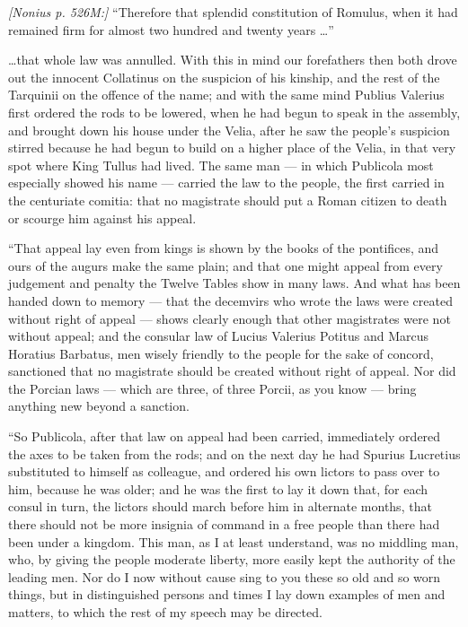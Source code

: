  \textit{[Nonius p. 526M:]} ``Therefore that splendid constitution of Romulus, when it had remained firm for almost two hundred and twenty years \ldots''

 \ldots that whole law was annulled. With this in mind our forefathers then both drove out the innocent Collatinus on the suspicion of his kinship, and the rest of the Tarquinii on the offence of the name; and with the same mind Publius Valerius first ordered the rods to be lowered, when he had begun to speak in the assembly, and brought down his house under the Velia, after he saw the people's suspicion stirred because he had begun to build on a higher place of the Velia, in that very spot where King Tullus had lived. The same man --- in which Publicola most especially showed his name --- carried the law to the people, the first carried in the centuriate comitia: that no magistrate should put a Roman citizen to death or scourge him against his appeal.

 ``That appeal lay even from kings is shown by the books of the pontifices, and ours of the augurs make the same plain; and that one might appeal from every judgement and penalty the Twelve Tables show in many laws. And what has been handed down to memory --- that the decemvirs who wrote the laws were created without right of appeal --- shows clearly enough that other magistrates were not without appeal; and the consular law of Lucius Valerius Potitus and Marcus Horatius Barbatus, men wisely friendly to the people for the sake of concord, sanctioned that no magistrate should be created without right of appeal. Nor did the Porcian laws --- which are three, of three Porcii, as you know --- bring anything new beyond a sanction.

 ``So Publicola, after that law on appeal had been carried, immediately ordered the axes to be taken from the rods; and on the next day he had Spurius Lucretius substituted to himself as colleague, and ordered his own lictors to pass over to him, because he was older; and he was the first to lay it down that, for each consul in turn, the lictors should march before him in alternate months, that there should not be more insignia of command in a free people than there had been under a kingdom. This man, as I at least understand, was no middling man, who, by giving the people moderate liberty, more easily kept the authority of the leading men. Nor do I now without cause sing to you these so old and so worn things, but in distinguished persons and times I lay down examples of men and matters, to which the rest of my speech may be directed.

